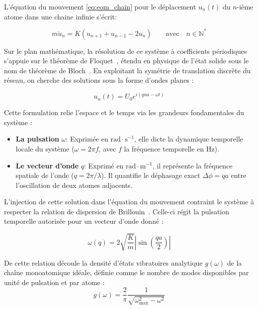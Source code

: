 L'équation du mouvement \eqref{eq:eom_chain} pour le déplacement $u_n(t)$ du $n$-ième atome dans une chaine infinie s'écrit:

\begin{equation}\label{eq:eom_chain}
    m \ddot{u}_n = K(u_{n+1} + u_{n-1} - 2u_n) \hspace{2em}  \text{avec} \hspace{1em} n \in \mathbb{N}^*
\end{equation}

Sur le plan mathématique, la résolution de ce système à coefficients périodiques s'appuie sur le théorème de Floquet~\cite{floquet1883equations}, étendu en physique de l'état solide sous le nom de théorème de Bloch~\cite{bloch1929quantenmechanik}. En exploitant la symétrie de translation discrète du réseau, on cherche des solutions sous la forme d'ondes planes :

\begin{equation*}
    u_n(t) = U_0 e^{i(q n a - \omega t)}
\end{equation*}

Cette formulation relie l'espace et le temps via les grandeurs fondamentales du système :

\begin{itemize}
    \item \textbf{La pulsation} $\omega$: Exprimée en $\text{rad}\cdot\text{s}^{-1}$, elle dicte la dynamique temporelle locale du système ($\omega = 2\pi f$, avec $f$ la fréquence temporelle en Hz).
    \item \textbf{Le vecteur d'onde} $q$: Exprimé en $\text{rad}\cdot\text{m}^{-1}$, il représente la fréquence spatiale de l'onde ($q = 2\pi/\lambda$). Il quantifie le déphasage exact $\Delta \phi = q a$ entre l'oscillation de deux atomes adjacents.
\end{itemize}

L'injection de cette solution dans l'équation du mouvement contraint le système à respecter la relation de dispersion de Brillouin~\cite{brillouin1953wave}. Celle-ci régit la pulsation temporelle autorisée pour un vecteur d'onde donné :

\begin{equation}
    \omega(q) = 2\sqrt{\frac{K}{m}} \left| \sin\left(\frac{qa}{2}\right) \right|
\end{equation}

De cette relation découle la densité d'états vibratoires analytique $g(\omega)$ de la chaîne monoatomique idéale, définie comme le nombre de modes disponibles par unité de pulsation et par atome :
\begin{equation}\label{eq:dos_mono}
    g(\omega) = \frac{2}{\pi} \frac{1}{\sqrt{\omega_{\max}^2 - \omega^2}}
\end{equation}

